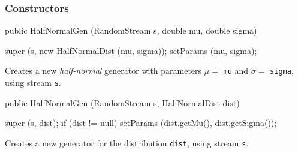 \subsubsection* {Constructors}
\begin{code}

   public HalfNormalGen (RandomStream s, double mu, double sigma) \begin{hide} {
      super (s, new HalfNormalDist (mu, sigma));
      setParams (mu, sigma);
   }\end{hide}
\end{code}
  \begin{tabb}  Creates a new {\em half-normal} generator with parameters $\mu =$ 
     \texttt{mu} and $\sigma =$ \texttt{sigma}, using stream \texttt{s}.
\end{tabb}
\begin{code}

   public HalfNormalGen (RandomStream s, HalfNormalDist dist) \begin{hide} {
      super (s, dist);
      if (dist != null)
         setParams (dist.getMu(), dist.getSigma());
   }\end{hide}
\end{code}
\begin{tabb} Creates a new generator for the distribution \texttt{dist},
     using stream \texttt{s}.
\end{tabb}


